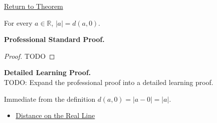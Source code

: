\newpage
{}
\label{prf:abs-value-is-distance-to-zero}

\begin{remark*}[Return]
\hyperref[prop:abs-value-is-distance-to-zero]{Return to Theorem}
\end{remark*}

\begin{proposition*}
For every $a\in\mathbb{R}$, $|a|=d(a,0)$.
\end{proposition*}

\textbf{Professional Standard Proof.}~\\
\begin{proof}
TODO
\end{proof}

\textbf{Detailed Learning Proof.}~\\
TODO: Expand the professional proof into a detailed learning proof.

\begin{remark*}
Immediate from the definition $d(a,0)=|a-0|=|a|$.
\end{remark*}

\begin{dependencies}
\begin{itemize}
  \item \hyperref[def:distance-on-real-line]{Distance on the Real Line}
\end{itemize}
\end{dependencies}
